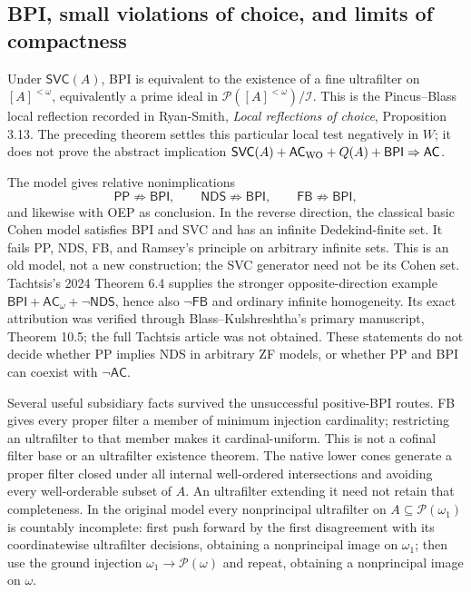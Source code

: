 \subsection{BPI, small violations of choice, and limits of compactness}

Under $\mathsf{SVC}(A)$, BPI is equivalent to the existence of a fine
ultrafilter on $[A]^{<\omega}$, equivalently a prime ideal in
$\mathcal P([A]^{<\omega})/\mathcal I$. This is the Pincus--Blass local
reflection recorded in Ryan-Smith, \emph{Local reflections of choice},
Proposition 3.13. The preceding theorem settles this particular local
test negatively in $W$; it does not prove the abstract implication
$\mathsf{SVC}(A)+\mathsf{AC}_{\rm WO}+Q(A)+\mathsf{BPI}\Rightarrow
\mathsf{AC}$.

The model gives relative nonimplications
\[
 \mathsf{PP}\not\Rightarrow\mathsf{BPI},\qquad
 \mathsf{NDS}\not\Rightarrow\mathsf{BPI},\qquad
 \mathsf{FB}\not\Rightarrow\mathsf{BPI},
\]
and likewise with OEP as conclusion. In the reverse direction, the
classical basic Cohen model satisfies BPI and SVC and has an infinite
Dedekind-finite set. It fails PP, NDS, FB, and Ramsey's principle on
arbitrary infinite sets. This is an old model, not a new construction;
the SVC generator need not be its Cohen set. Tachtsis's 2024 Theorem
6.4 supplies the stronger opposite-direction example
$\mathsf{BPI}+\mathsf{AC}_\omega+\neg\mathsf{NDS}$, hence also
$\neg\mathsf{FB}$ and ordinary infinite homogeneity. Its exact
attribution was verified through Blass--Kulshreshtha's primary
manuscript, Theorem 10.5; the full Tachtsis article was not obtained.
These statements do not decide whether PP implies NDS in arbitrary
ZF models, or whether PP and BPI can coexist with $\neg\mathsf{AC}$.

Several useful subsidiary facts survived the unsuccessful positive-BPI
routes. FB gives every proper filter a member of minimum injection
cardinality; restricting an ultrafilter to that member makes it
cardinal-uniform. This is not a cofinal filter base or an ultrafilter
existence theorem. The native lower cones generate a proper filter
closed under all internal well-ordered intersections and avoiding every
well-orderable subset of $A$. An ultrafilter extending it need not retain
that completeness. In the original model every nonprincipal ultrafilter
on $A\subseteq\mathcal P(\omega_1)$ is countably incomplete: first
push forward by the first disagreement with its coordinatewise
ultrafilter decisions, obtaining a nonprincipal image on $\omega_1$;
then use the ground injection $\omega_1\to\mathcal P(\omega)$ and
repeat, obtaining a nonprincipal image on $\omega$.

